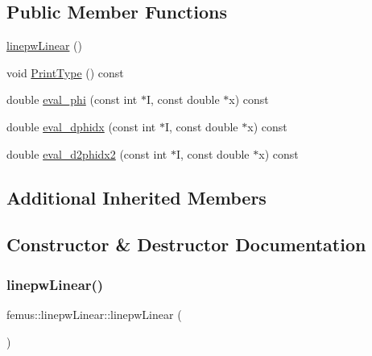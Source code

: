 \subsection*{Public Member Functions}
\begin{DoxyCompactItemize}
\item 
\mbox{\hyperlink{classfemus_1_1linepw_linear_adc541f10e7e27f34e4bd29da38030f91}{linepw\+Linear}} ()
\item 
void \mbox{\hyperlink{classfemus_1_1linepw_linear_a0f482e5b4646b44faebfaeb6d085219a}{Print\+Type}} () const
\item 
double \mbox{\hyperlink{classfemus_1_1linepw_linear_aaf2ad7bcf89fee3022a36b677872ae23}{eval\+\_\+phi}} (const int $\ast$I, const double $\ast$x) const
\item 
double \mbox{\hyperlink{classfemus_1_1linepw_linear_a8fca1e50abd1203c8c6867b37969e551}{eval\+\_\+dphidx}} (const int $\ast$I, const double $\ast$x) const
\item 
double \mbox{\hyperlink{classfemus_1_1linepw_linear_ab935d5269619bc6d422a8fbad4daf017}{eval\+\_\+d2phidx2}} (const int $\ast$I, const double $\ast$x) const
\end{DoxyCompactItemize}
\subsection*{Additional Inherited Members}


\subsection{Constructor \& Destructor Documentation}
\mbox{\label{classfemus_1_1linepw_linear_adc541f10e7e27f34e4bd29da38030f91}} 
\subsubsection{\texorpdfstring{linepw\+Linear()}{linepwLinear()}}
{\footnotesize\ttfamily femus\+::linepw\+Linear\+::linepw\+Linear (\begin{DoxyParamCaption}{ }\end{DoxyParamCaption})\hspace{0.3cm}{\ttfamily [inline]}}



